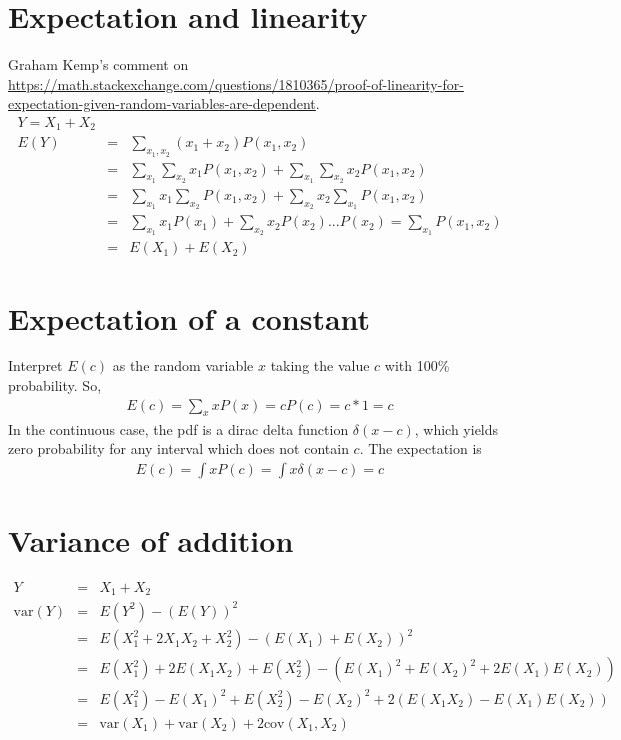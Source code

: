 \documentclass{article}
\newcommand{\ber}{\begin{eqnarray}}
\newcommand{\eer}{\end{eqnarray}}
\begin{document}
\section{Expectation and linearity}
Graham Kemp's comment on \url{https://math.stackexchange.com/questions/1810365/proof-of-linearity-for-expectation-given-random-variables-are-dependent}.
\ber
Y = X_1 + X_2 \\
E(Y) &=& \sum_{x_1,x_2}(x_1 + x_2)P(x_1,x_2) \\
&=& \sum_{x_1}\sum_{x_2}x_1P(x_1,x_2) + \sum_{x_1}\sum_{x_2}x_2P(x_1,x_2) \\
&=& \sum_{x_1}x_1\sum_{x_2}P(x_1,x_2)  + \sum_{x_2}x_2\sum_{x_1}P(x_1,x_2) \\
&=& \sum_{x_1}x_1P(x_1) + \sum_{x_2}x_2P(x_2) \text{...}P(x_2)=\sum_{x_1}P(x_1,x_2)\\
&=& E(X_1) + E(X_2)
\eer
\section{Expectation of a constant}
Interpret $E(c)$ as the random variable $x$ taking the value $c$ with 100\% probability. So,
\ber
E(c) = \sum_{x}xP(x) = cP(c) = c*1 = c
\eer
In the continuous case, the pdf is a dirac delta function $\delta(x-c)$, which yields zero probability for any interval which does not contain $c$. The expectation is
\ber
E(c) = \int xP(c) = \int x \delta(x-c) = c
\eer
\section{Variance of addition}
\ber
Y &=& X_1 + X_2 \\
\text{var}(Y) &=& E(Y^2) - (E(Y))^2\\
&=& E(X_1^2 + 2X_1X_2 + X_2^2) - (E(X_1) + E(X_2))^2 \\
&=& E(X_1^2) + 2E(X_1X_2) + E(X_2^2) - (E(X_1)^2 + E(X_2)^2 + 2E(X_1)E(X_2)) \\
&=& E(X_1^2) - E(X_1)^2 + E(X_2^2) - E(X_2)^2 +2(E(X_1X_2)-E(X_1)E(X_2)) \\
&=& \text{var}(X_1) + \text{var}(X_2) +2\text{cov}(X_1,X_2)
\eer
\end{document}
